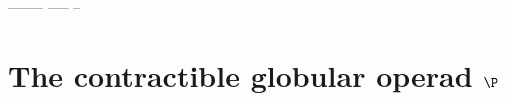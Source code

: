 % 
% 
% 









--------%
-----%
--%









% 
% 
\section{The contractible globular operad \texorpdfstring{$\P$}{P\_ML\_Id}} \label{sec:the-operad}


